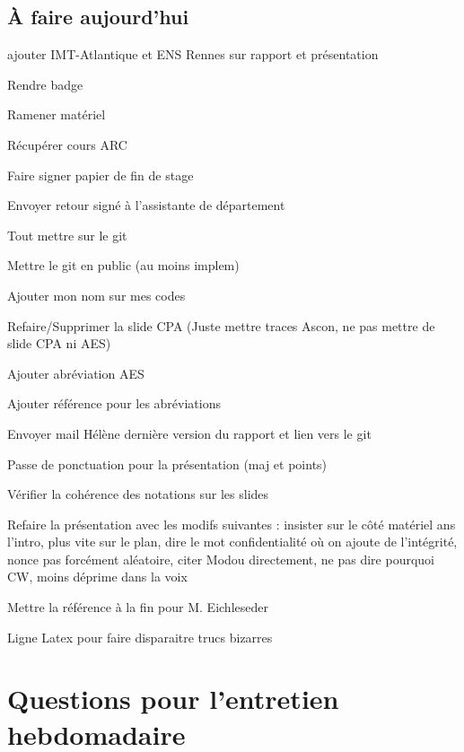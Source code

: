 \documentclass[12pt]{article}
\newcommand{\cmark}{\ding{51}}%
\newcommand{\done}{\rlap{$\square$}{\raisebox{2pt}{\large\hspace{1pt}\cmark}}%
	\hspace{-2.5pt}}
\begin{document}
	\subsection{À faire aujourd'hui}	
	\begin{todolist}
		\item[\done] ajouter IMT-Atlantique et ENS Rennes sur rapport et présentation
		\item Rendre badge
		\item Ramener matériel
		\item[\done] Récupérer cours ARC
		\item[\done] Faire signer papier de fin de stage
		\item Envoyer retour signé à l'assistante de département
		\item Tout mettre sur le git
		\item Mettre le git en public (au moins implem)
		\item[\done] Ajouter mon nom sur mes codes
		\item[\done] Refaire/Supprimer la slide CPA (Juste mettre traces Ascon, ne pas mettre de slide CPA ni AES)
		\item[\done] Ajouter abréviation AES
		\item[\done] Ajouter référence pour les abréviations
		\item[\done] Envoyer mail Hélène dernière version du rapport et lien vers le git
		\item[\done] Passe de ponctuation pour la présentation (maj et points)
		\item[\done] Vérifier la cohérence des notations sur les slides
		\item Refaire la présentation avec les modifs suivantes : insister sur le côté matériel ans l'intro, plus vite sur le plan, dire le mot confidentialité où on ajoute de l'intégrité, nonce pas forcément aléatoire, citer Modou directement, ne pas dire pourquoi CW, moins déprime dans la voix
		\item[\done] Mettre la référence à la fin pour M. Eichleseder
		\item[\done] Ligne Latex pour faire disparaitre trucs bizarres
	\end{todolist}
	
	
	
	\section{Questions pour l'entretien hebdomadaire}
\end{document}
